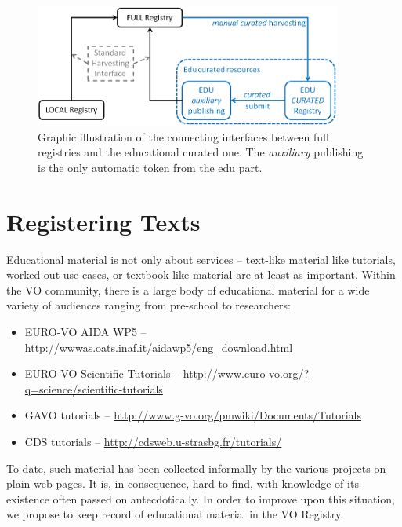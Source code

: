 \documentclass{ivoa}
\begin{document}
\begin{figure}

\includegraphics[width=0.9\textwidth]{curation.png}
\caption{Graphic illustration
    of the connecting interfaces between full registries and the educational
    curated one. The 
\emph{auxiliary}
 publishing is the only automatic token
    from the edu part.}
\label{fig:curation}
\end{figure}

\section{Registering Texts}

\label{sect:regext}

Educational material is not only about services – text-like material
like tutorials, worked-out use cases, or textbook-like material are at
least as important.  Within the VO community, there is a large body of
educational material for a wide variety of audiences ranging from pre-school to
researchers:

\begin{itemize}

\item EURO-VO AIDA WP5 -- \url{http://wwwas.oats.inaf.it/aidawp5/eng_download.html}

\item EURO-VO Scientific Tutorials -- \url{http://www.euro-vo.org/?q=science/scientific-tutorials}

\item GAVO tutorials --
\url{http://www.g-vo.org/pmwiki/Documents/Tutorials}

\item CDS tutorials -- \url{http://cdsweb.u-strasbg.fr/tutorials/}
\end{itemize}


To date, such material has been collected informally by the various
projects on plain web pages.  It is, in consequence, hard to find, with
knowledge of its existence often passed on antecdotically. In order to improve upon 
this situation, we
propose to keep record of educational material in the VO Registry.
\end{document}

